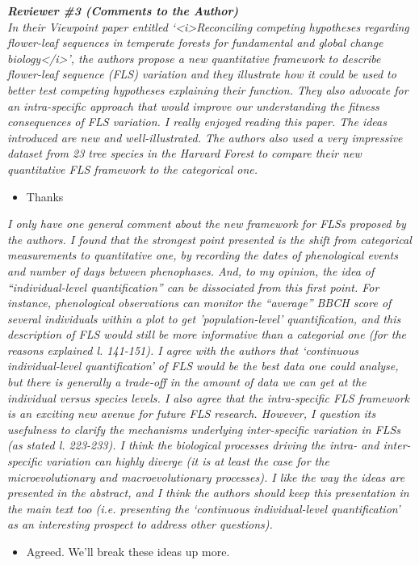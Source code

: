 \documentclass{article}[11pt]
\begin{document}
\emph{{\bf Reviewer \#3 (Comments to the Author)}}\\
\emph{In their Viewpoint paper entitled ‘<i>Reconciling competing hypotheses regarding flower-leaf sequences in temperate forests for fundamental and global change biology</i>’, the authors propose a new quantitative framework to describe flower-leaf sequence (FLS) variation and they illustrate how it could be used to better test competing hypotheses explaining their function. They also advocate for an intra-specific approach that would improve our understanding the fitness consequences of FLS variation.
I really enjoyed reading this paper. The ideas introduced are new and well-illustrated. The authors also used a very impressive dataset from 23 tree species in the Harvard Forest to compare their new quantitative FLS framework to the categorical one.}
\begin{itemize}
\item Thanks
\end{itemize}
\emph{I only have one general comment about the new framework for FLSs proposed by the authors. I found that the strongest point presented is the shift from categorical measurements to quantitative one, by recording the dates of phenological events and number of days between phenophases. And, to my opinion, the idea of ``individual-level quantification'' can be dissociated from this first point. For instance, phenological observations can monitor the ``average'' BBCH score of several individuals within a plot to get 'population-level' quantification, and this description of FLS would still be more informative than a categorial one (for the reasons explained l. 141-151). I agree with the authors that ‘continuous individual-level quantification’ of FLS would be the best data one could analyse, but there is generally a trade-off in the amount of data we can get at the individual versus species levels. I also agree that the intra-specific FLS framework is an exciting new avenue for future FLS research. However, I question its usefulness to clarify the mechanisms underlying inter-specific variation in FLSs (as stated l. 223-233). I think the biological processes driving the intra- and inter-specific variation can highly diverge (it is at least the case for the microevolutionary and macroevolutionary processes). I like the way the ideas are presented in the abstract, and I think the authors should keep this presentation in the main text too (i.e. presenting the ‘continuous individual-level quantification’ as an interesting prospect to address other questions).}
\begin{itemize}
\item Agreed. We'll break these ideas up more.
\end{itemize}
\end{document}
